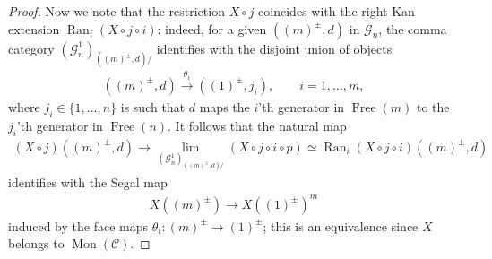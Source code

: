 \documentclass[12pt, reqno]{amsart}
\theoremstyle{plain}
\theoremstyle{definition}
\begin{document}
\begin{proof}
Now we note that the restriction $X\circ j$ coincides with the right Kan extension $\operatorname{Ran}_i(X\circ j\circ i)$: indeed, for a given $((m)^\pm,d)$ in $\mathcal{G}_n$, the comma category $(\mathcal{G}^1_n)_{((m)^\pm,d)/}$ identifies with the disjoint union of objects
\begin{align*}
((m)^\pm,d)\xrightarrow{\theta_i} ((1)^\pm,j_i),\qquad i=1,\ldots,m,
\end{align*}
where $j_i\in \{1,\ldots, n\}$ is such that $d$ maps the $i$'th generator in $\operatorname{Free}(m)$ to the $j_i$'th generator in $\operatorname{Free}(n)$.
It follows that the natural map
\begin{align*}
(X\circ j)((m)^\pm,d)\longrightarrow \mathop{\operatorname{lim}}_{(\mathcal{G}^1_n)_{((m)^\pm,d)/}} (X\circ j\circ i\circ p) \simeq \operatorname{Ran}_i(X\circ j\circ i)((m)^\pm,d)
\end{align*}
identifies with the Segal map 
\begin{align*}
X((m)^\pm)\rightarrow X((1)^\pm)^m
\end{align*}
induced by the face maps $\theta_i\colon (m)^\pm \rightarrow (1)^\pm$; this is an equivalence since $X$ belongs to $\operatorname{Mon}(\mathcal{C})$.


\end{proof}
\end{document}
